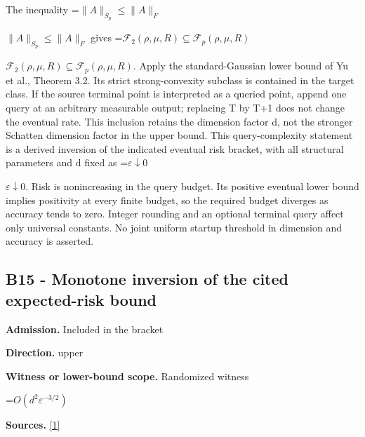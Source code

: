 \documentclass[10pt,a4paper]{article}
\newcommand{\AtlasMath}[1]{\par\begingroup\centering\setbox0=\hbox{$\displaystyle #1$}\ifdim\wd0>1.4\linewidth\typeout{ATLAS WIDE FORMULA: \the\wd0}\fi\ifdim\wd0>\linewidth\resizebox{\linewidth}{!}{\box0}\else\box0\fi\par\endgroup}
\newcommand{\AtlasInlineMath}[1]{\begingroup\setbox0=\hbox{$#1$}\ifdim\wd0>.4\linewidth\endgroup\AtlasMath{#1}\else\endgroup$#1$\fi}
\begin{document}
The inequality \AtlasInlineMath{\|A\|_{S_p}\le\|A\|_F} gives \AtlasInlineMath{\mathcal F_2(\rho,\mu,R)\subseteq\mathcal F_p(\rho,\mu,R)}. Apply the standard-Gaussian lower bound of Yu et al., Theorem 3.2. Its strict strong-convexity subclass is contained in the target class. If the source terminal point is interpreted as a queried point, append one query at an arbitrary measurable output; replacing T by T+1 does not change the eventual rate. This inclusion retains the dimension factor d, not the stronger Schatten dimension factor in the upper bound. This query-complexity statement is a derived inversion of the indicated eventual risk bracket, with all structural parameters and d fixed as \AtlasInlineMath{\varepsilon\downarrow0}. Risk is nonincreasing in the query budget. Its positive eventual lower bound implies positivity at every finite budget, so the required budget diverges as accuracy tends to zero. Integer rounding and an optional terminal query affect only universal constants. No joint uniform startup threshold in dimension and accuracy is asserted.



\subsection{B15 - Monotone inversion of the cited expected-risk bound}


\textbf{Admission.} Included in the bracket



\textbf{Direction.} upper



\textbf{Witness or lower-bound scope.} Randomized witness



\AtlasMath{O(d^2\varepsilon^{-3/2})}


\textbf{Sources.} \href{https://papers.nips.cc/paper_files/paper/2024/file/b444ad72520a5f5c467343be88e352ed-Paper-Conference.pdf}{[1]}
\end{document}
